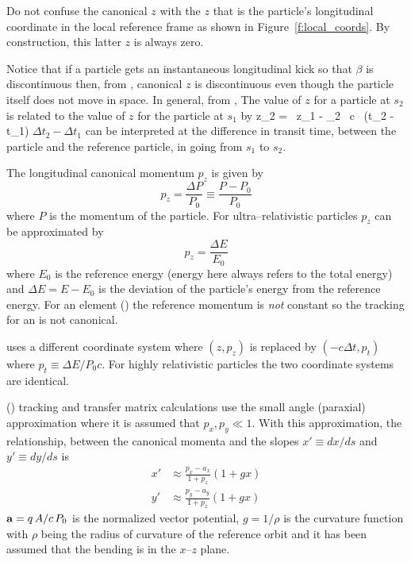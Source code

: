 Do not confuse the canonical $z$ with the $z$ that is the particle's
longitudinal coordinate in the local reference frame as shown in
Figure~\ref{f:local_coords}. By construction, this latter $z$ is
always zero.

Notice that if a particle gets an instantaneous longitudinal kick so
that $\beta$ is discontinuous then, from , canonical $z$ is
discontinuous even though the particle itself does not move in
space. In general, from , The value of $z$ for a particle at
$s_2$ is related to the value of $z$ for the particle at $s_1$ by
\Begineq
  z_2 =  \, z_1 - 
  \beta_2 \, c \, (\Delta t_2 - \Delta t_1)
  \label{zbbzb}
\Endeq
$\Delta t_2 - \Delta t_1$ can be interpreted at the difference in
transit time, between the particle and the reference particle, in going
from $s_1$ to $s_2$.

The longitudinal canonical momentum $p_z$ is given by
\begin{equation}
  p_z = \frac{\Delta P}{P_0} \equiv \frac{P - P_0}{P_0}
\end{equation}
where $P$ is the momentum of the particle. For ultra--relativistic particles
$p_z$ can be approximated by
\begin{equation}
  p_z = \frac{\Delta E}{E_0}
\end{equation}
where $E_0$ is the reference energy (energy here always refers to the
total energy) and $\Delta E = E - E_0$ is the deviation of the
particle's energy from the reference energy. For an 
element () the reference momentum is {\it not} constant
so the tracking for an  is not canonical.


\mad uses a different coordinate system where $(z, p_z)$ is
replaced by $(-c\Delta t, p_t)$ where $p_t \equiv \Delta E / P_0
c$. For highly relativistic particles the two coordinate systems are
identical.

 () tracking and transfer matrix
calculations use the small angle (paraxial) approximation where it is
assumed that $p_x, p_y \ll 1$. With this approximation, the
relationship, between the canonical momenta and the slopes $x' \equiv
dx/ds$ and $y' \equiv dy/ds$ is
\begin{align}
  x' &\approx \frac{p_x - a_x}{1 + p_z} (1 + g x) \\
  y' &\approx \frac{p_y - a_y}{1 + p_z} (1 + g x) 
  \label{xpa1p}
\end{align}
${\bf a} = q \, A / c \, P_0$ is the normalized vector potential, $g =
1/\rho$ is the curvature function with $\rho$ being the radius of
curvature of the reference orbit and it has been assumed that the
bending is in the $x$--$z$ plane. 


